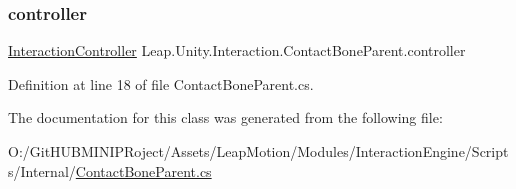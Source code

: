 \subsubsection{\texorpdfstring{controller}{controller}}
{\footnotesize\ttfamily \mbox{\hyperlink{class_leap_1_1_unity_1_1_interaction_1_1_interaction_controller}{Interaction\+Controller}} Leap.\+Unity.\+Interaction.\+Contact\+Bone\+Parent.\+controller}



Definition at line 18 of file Contact\+Bone\+Parent.\+cs.



The documentation for this class was generated from the following file\+:\begin{DoxyCompactItemize}
\item 
O\+:/\+Git\+H\+U\+B\+M\+I\+N\+I\+P\+Roject/\+Assets/\+Leap\+Motion/\+Modules/\+Interaction\+Engine/\+Scripts/\+Internal/\mbox{\hyperlink{_contact_bone_parent_8cs}{Contact\+Bone\+Parent.\+cs}}\end{DoxyCompactItemize}

